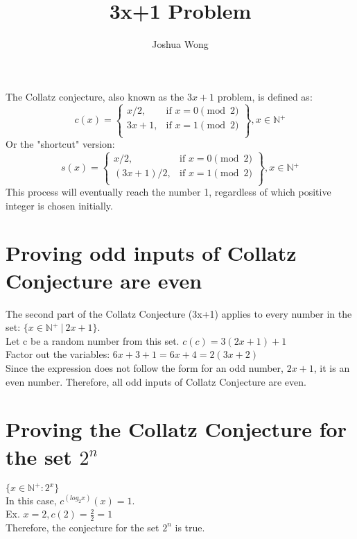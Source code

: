 \documentclass[a4paper,10pt]{article}
\title{3x+1 Problem}
\author{Joshua Wong}
\begin{document}
\maketitle
  The Collatz conjecture, also known as the \(3x+1\) problem, is defined as:
  \[
    c(x) = \left.
    \begin{cases}
        x/2, & \text{if } x = 0 {\pmod {2}}\\
        3x+1, & \text{if } x = 1 {\pmod {2}} \\
        \end{cases}
    \right\}, x \in \mathbb{N{^+}}
  \]
  Or the "shortcut" version:
  \[
    s(x) = \left.
    \begin{cases}
        x/2, & \text{if } x = 0 {\pmod {2}}\\
        (3x+1)/2, & \text{if } x = 1 {\pmod {2}} \\
        \end{cases}
    \right\}, x \in \mathbb{N{^+}}
  \]
  This process will eventually reach the number 1, regardless of which positive integer is chosen initially.
  \section{Proving odd inputs of Collatz Conjecture are even}
  The second part of the Collatz Conjecture (3x+1) applies to every number in the set: \(\{ x \in \mathbb{N{^+}} \ | \ 2x+1 \}\). \\
  Let c be a random number from this set. \(c(c) = 3(2x+1)+1 \) \\
  Factor out the variables: \(6x+3+1 = 6x+4 = 2(3x+2)\) \\
  Since the expression does not follow the form for an odd number, \(2x+1\), it is an even number.
  Therefore, all odd inputs of Collatz Conjecture are even.
  \section{Proving the Collatz Conjecture for the set $2^{n}$}
  \(\{x \in \mathbb{N{^+}}: 2{^x}\}\) \\
  In this case, \(c^{(log_2{x})}(x) = 1\). \\
  Ex. \(x = 2, c(2) = \frac{2}{2} = 1\) \\
  Therefore, the conjecture for the set $2^{n}$ is true.
\end{document}
